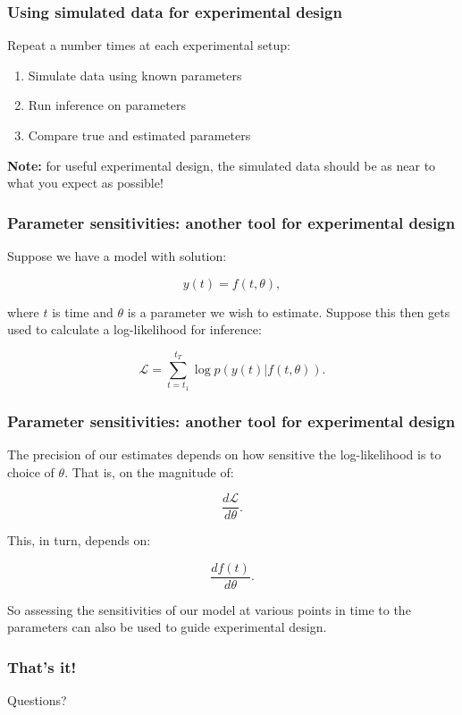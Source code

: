 \documentclass[handout]{beamer}
\begin{document}
\begin{frame}
	\frametitle{Using simulated data for experimental design}
	
	Repeat a number times at each experimental setup:
	\begin{enumerate}
		\item Simulate data using known parameters
		\item Run inference on parameters
		\item Compare true and estimated parameters
	\end{enumerate}
	
	\textbf{Note:} for useful experimental design, the simulated data should be as near to what you expect as possible!
\end{frame}

\begin{frame}
	\frametitle{Parameter sensitivities: another tool for experimental design}
	
	Suppose we have a model with solution:
	
	\begin{equation}
	y(t) = f(t, \theta),
	\end{equation}
	
	where $t$ is time and $\theta$ is a parameter we wish to estimate. Suppose this then gets used to calculate a log-likelihood for inference:
	
	\begin{equation}
	\mathcal{L} = \sum_{t=t_1}^{t_T} \log p(y(t)|f(t, \theta)).
	\end{equation}
	
\end{frame}

\begin{frame}
	\frametitle{Parameter sensitivities: another tool for experimental design}
	
	The precision of our estimates depends on how sensitive the log-likelihood is to choice of $\theta$. That is, on the magnitude of:
	
	\begin{equation}
	\frac{d\mathcal{L}}{d\theta}.
	\end{equation}
	
	This, in turn, depends on:
	
	\begin{equation}
	\frac{d f(t)}{d \theta}.
	\end{equation}
	
	So assessing the sensitivities of our model at various points in time to the parameters can also be used to guide experimental design.
	
\end{frame}

\begin{frame}
	\frametitle{That's it!}
	
	\Large Questions?
\end{frame}
\end{document}
